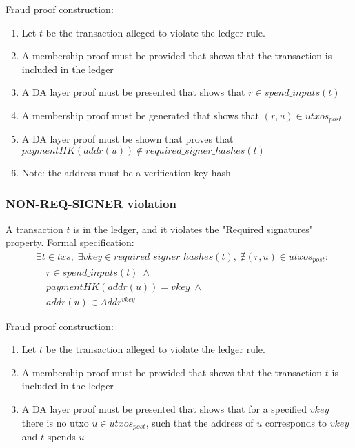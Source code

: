\documentclass[../midgard.tex]{subfiles}
\begin{document}
Fraud proof construction:
\begin{enumerate}
  \item Let $t$ be the transaction alleged to violate the ledger rule. 
  \item A membership proof must be provided that shows that the transaction is included in the ledger
  \item A DA layer proof must be presented that shows that $r \in spend\_inputs(t)$
  \item A membership proof must be generated that shows that $(r, u) \in utxos_{post}$
  \item A DA layer proof must be shown that proves that \\ $paymentHK(addr(u)) \notin required\_signer\_hashes(t)$
  \item Note: the address must be a verification key hash
\end{enumerate}

\subsubsection{NON-REQ-SIGNER violation}
\label{violation:NON-REQ-SIGNER}
A transaction $t$ is in the ledger, and it violates the "Required signatures" property.
Formal specification:
\begin{equation*}
\begin{split}
  &\exists t \in txs,\; \exists vkey \in required\_signer\_hashes(t),\;
    \nexists (r, u) \in utxos_{post}: \\
    &\quad r \in spend\_inputs(t) \;\land\\
    &\quad paymentHK(addr(u)) = vkey \;\land\\
    &\quad addr(u) \in Addr^{vkey}
\end{split}
\end{equation*}

Fraud proof construction:
\begin{enumerate}
  \item Let $t$ be the transaction alleged to violate the ledger rule. 
  \item A membership proof must be provided that shows that the transaction $t$ is included in the ledger
  \item A DA layer proof must be presented that shows that for a specified $vkey$ there is no utxo $u \in utxos_{post}$, such that the address of $u$ corresponds to $vkey$ and $t$ spends $u$
\end{enumerate}
\end{document}
